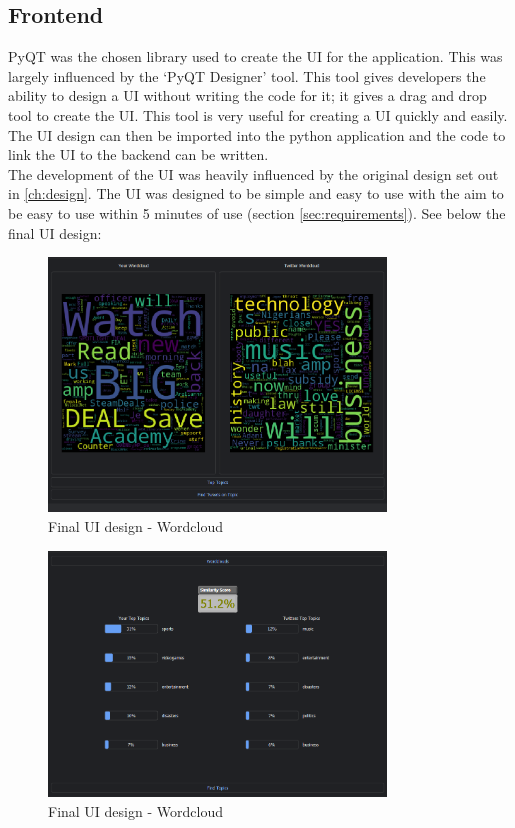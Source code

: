 \subsection{Frontend}
PyQT was the chosen library used to create the UI for the application. This was largely influenced by the `PyQT Designer' tool. This tool gives
developers the ability to design a UI without writing the code for it; it gives a drag and drop tool to create the UI. This tool is very useful
for creating a UI quickly and easily. The UI design can then be imported into the python application and the code to link the UI to the backend
can be written.\\
The development of the UI was heavily influenced by the original design set out in \cref{ch:design}. The UI was designed to be simple and easy to use
with the aim to be easy to use within 5 minutes of use (section \ref{sec:requirements}). See below the final UI design:
\begin{figure}[h]
    \centering
    \includegraphics[width=0.8\textwidth]{../images/UI-dark-1-wc.png}
    \caption{Final UI design - Wordcloud}
    \label{fig:ui-wordcloud}
\end{figure}
\begin{figure}[h]
    \centering
    \includegraphics[width=0.8\textwidth]{../images/UI-dark-1-tt.png}
    \caption{Final UI design - Wordcloud}
    \label{fig:ui-toptopics}
\end{figure}
